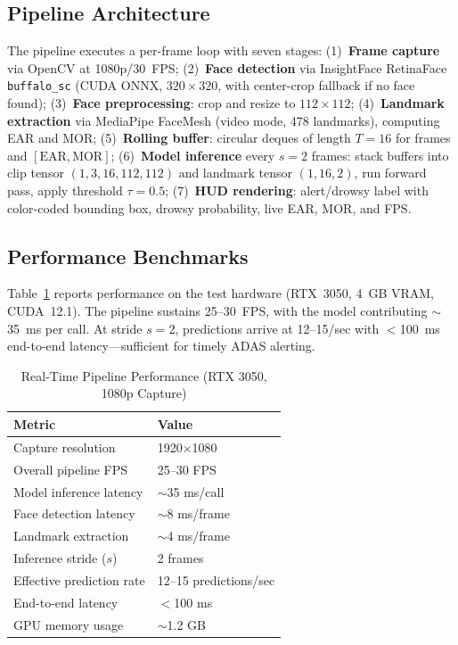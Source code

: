 \documentclass[journal]{IEEEtran}
\begin{document}
\subsection{Pipeline Architecture}
\label{sec:rt_pipeline}
The pipeline executes a per-frame loop with seven stages: (1)~\textbf{Frame capture} via OpenCV at 1080p/30~FPS; (2)~\textbf{Face detection} via InsightFace RetinaFace \texttt{buffalo\_sc} (CUDA ONNX, $320\times320$, with center-crop fallback if no face found); (3)~\textbf{Face preprocessing}: crop and resize to $112\times112$; (4)~\textbf{Landmark extraction} via MediaPipe FaceMesh (video mode, 478 landmarks), computing EAR and MOR; (5)~\textbf{Rolling buffer}: circular deques of length $T{=}16$ for frames and $[\text{EAR},\text{MOR}]$; (6)~\textbf{Model inference} every $s{=}2$ frames: stack buffers into clip tensor $(1,3,16,112,112)$ and landmark tensor $(1,16,2)$, run forward pass, apply threshold $\tau{=}0.5$; (7)~\textbf{HUD rendering}: alert/drowsy label with color-coded bounding box, drowsy probability, live EAR, MOR, and FPS.

\subsection{Performance Benchmarks}
\label{sec:rt_performance}
Table~\ref{tab:rt_perf} reports performance on the test hardware (RTX~3050, 4~GB VRAM, CUDA~12.1). The pipeline sustains 25--30~FPS, with the model contributing $\sim$35~ms per call. At stride $s{=}2$, predictions arrive at 12--15/sec with $<$100~ms end-to-end latency---sufficient for timely ADAS alerting.

\begin{table}[t]
  \caption{Real-Time Pipeline Performance (RTX 3050, 1080p Capture)}
  \label{tab:rt_perf}
  \centering
  \begin{tabular}{ll}
    \toprule
    Metric & Value \\
    \midrule
    Capture resolution       & 1920$\times$1080 \\
    Overall pipeline FPS     & 25--30 FPS \\
    Model inference latency  & $\sim$35 ms/call \\
    Face detection latency   & $\sim$8 ms/frame \\
    Landmark extraction      & $\sim$4 ms/frame \\
    Inference stride ($s$)   & 2 frames \\
    Effective prediction rate & 12--15 predictions/sec \\
    End-to-end latency       & $<$100 ms \\
    GPU memory usage         & $\sim$1.2 GB \\
    \bottomrule
  \end{tabular}
\end{table}
\end{document}
